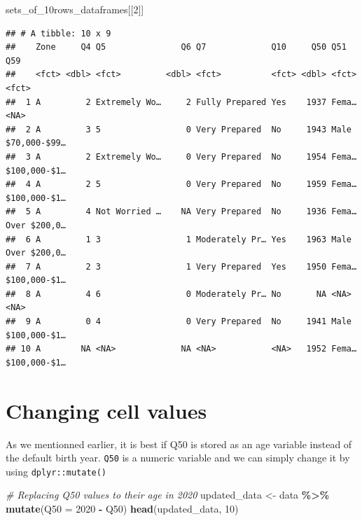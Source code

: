 \documentclass[
]{book}
\newenvironment{Shaded}{\begin{snugshade}}{\end{snugshade}}
\newcommand{\CommentTok}[1]{\textcolor[rgb]{0.56,0.35,0.01}{\textit{#1}}}
\newcommand{\DataTypeTok}[1]{\textcolor[rgb]{0.13,0.29,0.53}{#1}}
\newcommand{\DecValTok}[1]{\textcolor[rgb]{0.00,0.00,0.81}{#1}}
\newcommand{\KeywordTok}[1]{\textcolor[rgb]{0.13,0.29,0.53}{\textbf{#1}}}
\newcommand{\NormalTok}[1]{#1}
\newcommand{\OperatorTok}[1]{\textcolor[rgb]{0.81,0.36,0.00}{\textbf{#1}}}
\newcommand{\StringTok}[1]{\textcolor[rgb]{0.31,0.60,0.02}{#1}}
\begin{document}
\begin{Shaded}
\begin{Highlighting}[]
\NormalTok{sets\_of\_10rows\_dataframes[[}\DecValTok{2}\NormalTok{]]}
\end{Highlighting}
\end{Shaded}

\begin{verbatim}
## # A tibble: 10 x 9
##    Zone     Q4 Q5               Q6 Q7             Q10     Q50 Q51   Q59         
##    <fct> <dbl> <fct>         <dbl> <fct>          <fct> <dbl> <fct> <fct>       
##  1 A         2 Extremely Wo…     2 Fully Prepared Yes    1937 Fema… <NA>        
##  2 A         3 5                 0 Very Prepared  No     1943 Male  $70,000-$99…
##  3 A         2 Extremely Wo…     0 Very Prepared  No     1954 Fema… $100,000-$1…
##  4 A         2 5                 0 Very Prepared  No     1959 Fema… $100,000-$1…
##  5 A         4 Not Worried …    NA Very Prepared  No     1936 Fema… Over $200,0…
##  6 A         1 3                 1 Moderately Pr… Yes    1963 Male  Over $200,0…
##  7 A         2 3                 1 Very Prepared  Yes    1950 Fema… $100,000-$1…
##  8 A         4 6                 0 Moderately Pr… No       NA <NA>  <NA>        
##  9 A         0 4                 0 Very Prepared  No     1941 Male  $100,000-$1…
## 10 A        NA <NA>             NA <NA>           <NA>   1952 Fema… $100,000-$1…
\end{verbatim}

\hypertarget{changing-cell-values}{%
\section{Changing cell values}\label{changing-cell-values}}

As we mentionned earlier, it is best if Q50 is stored as an age variable instead of the default birth year. \texttt{Q50} is a numeric variable and we can simply change it by using \texttt{dplyr::mutate()}

\begin{Shaded}
\begin{Highlighting}[]
\CommentTok{\# Replacing Q50 values to their age in 2020}
\NormalTok{updated\_data \textless{}{-}}\StringTok{ }\NormalTok{data }\OperatorTok{\%\textgreater{}\%}\StringTok{ }\KeywordTok{mutate}\NormalTok{(}\DataTypeTok{Q50 =} \DecValTok{2020} \OperatorTok{{-}}\StringTok{ }\NormalTok{Q50)}
\KeywordTok{head}\NormalTok{(updated\_data, }\DecValTok{10}\NormalTok{)}
\end{Highlighting}
\end{Shaded}
\end{document}
